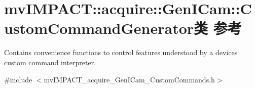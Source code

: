 \hypertarget{classmv_i_m_p_a_c_t_1_1acquire_1_1_gen_i_cam_1_1_custom_command_generator}{\section{mv\+I\+M\+P\+A\+C\+T\+:\+:acquire\+:\+:Gen\+I\+Cam\+:\+:Custom\+Command\+Generator类 参考}
\label{classmv_i_m_p_a_c_t_1_1acquire_1_1_gen_i_cam_1_1_custom_command_generator}
}


Contains convenience functions to control features understood by a devices custom command interpreter.  




{\ttfamily \#include $<$mv\+I\+M\+P\+A\+C\+T\+\_\+acquire\+\_\+\+Gen\+I\+Cam\+\_\+\+Custom\+Commands.\+h$>$}

